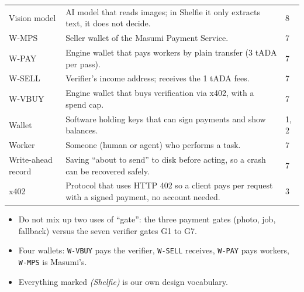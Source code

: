 {\begin{longtable}{@{}p{3.4cm}p{10.6cm}p{1.2cm}@{}}
Vision model & AI model that reads images; in Shelfie it only extracts text, it does not decide. & 8\\
W-MPS & Seller wallet of the Masumi Payment Service. & 7\\
W-PAY & Engine wallet that pays workers by plain transfer (3 tADA per pass). & 7\\
W-SELL & Verifier's income address; receives the 1 tADA fees. & 7\\
W-VBUY & Engine wallet that buys verification via x402, with a spend cap. & 7\\
Wallet & Software holding keys that can sign payments and show balances. & 1, 2\\
Worker & Someone (human or agent) who performs a task. & 7\\
Write-ahead record & Saving ``about to send'' to disk before acting, so a crash can be recovered safely. & 7\\
x402 & Protocol that uses HTTP 402 so a client pays per request with a signed payment, no account needed. & 3\\
\end{longtable}}

\begin{keypoints}
\begin{itemize}
  \item Do not mix up two uses of ``gate'': the three payment gates (photo, job, fallback) versus the seven verifier gates G1 to G7.
  \item Four wallets: \texttt{W-VBUY} pays the verifier, \texttt{W-SELL} receives, \texttt{W-PAY} pays workers, \texttt{W-MPS} is Masumi's.
  \item Everything marked \emph{(Shelfie)} is our own design vocabulary.
\end{itemize}
\end{keypoints}
